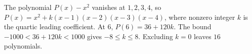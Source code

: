 The polynomial $P(x)-x^2$ vanishes at $1,2,3,4$, so $P(x)=x^2+k(x-1)(x-2)(x-3)(x-4)$, where nonzero integer $k$ is the quartic leading coefficient. At $6$, $P(6)=36+120k$. The bound $-1000<36+120k<1000$ gives $-8\le k\le 8$. Excluding $k=0$ leaves $\boxed{16}$ polynomials.
